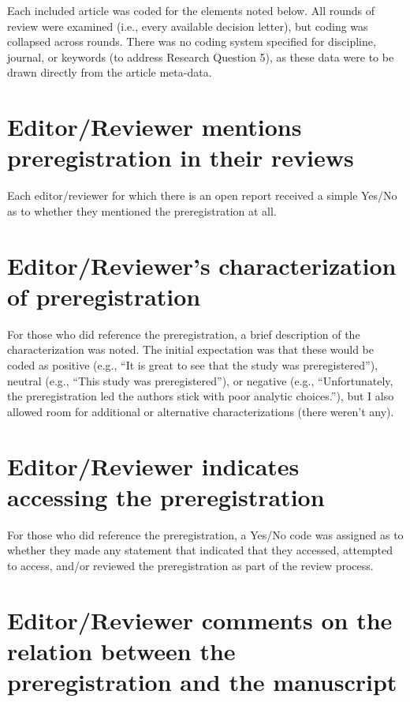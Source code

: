 \documentclass[authordate, empirical]{jote-new-article}
\begin{document}
	Each included article was coded for the elements noted below. All rounds of review were examined (i.e., every available decision letter), but coding was collapsed across rounds. There was no coding system specified for discipline, journal, or keywords (to address Research Question 5), as these data were to be drawn directly from the article meta-data.



	\section{\textbf{Editor/Reviewer mentions preregistration in their reviews}}



	Each editor/reviewer for which there is an open report received a simple Yes/No as to whether they mentioned the preregistration at all.



	\section{\textbf{Editor/Reviewer's characterization of preregistration} }



	For those who did reference the preregistration, a brief description of the characterization was noted. The initial expectation was that these would be coded as positive (e.g., “It is great to see that the study was preregistered”), neutral (e.g., “This study was preregistered”), or negative (e.g., “Unfortunately, the preregistration led the authors stick with poor analytic choices.”), but I also allowed room for additional or alternative characterizations (there weren't any).



	\section{\textbf{Editor/Reviewer indicates accessing the preregistration }}



	For those who did reference the preregistration, a Yes/No code was assigned as to whether they made any statement that indicated that they accessed, attempted to access, and/or reviewed the preregistration as part of the review process.



	\section{\textbf{Editor/Reviewer comments on the relation between the preregistration and the manuscript}}
\end{document}
